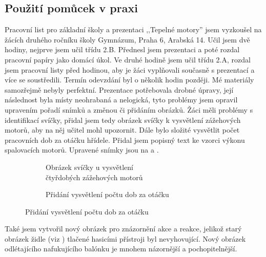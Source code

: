 \subsection{Použití pomůcek v praxi}\label{sc:pouzitiVPraxi}
{Pracovní list pro základní školy a prezentaci ,,Tepelné motory'' jsem vyzkoušel na žácích druhého ročníku školy Gymnázum, Praha 6, Arabská 14. Učil jsem dvě hodiny, nejprve jsem učil třídu 2.B. Přednesl jsem prezentaci a poté rozdal pracovní papíry jako domácí úkol. Ve druhé hodině jsem učil třídu 2.A, rozdal jsem pracovní listy před hodinou, aby je žáci vyplňovali současně s prezentací a více se soustředili. Termín odevzdání byl o několik hodin později.}\odst
{Mé materiály samozřejmě nebyly perfektní. Prezentace potřebovala drobné úpravy, její následnost byla místy neohrabaná a nelogická, tyto problémy jsem opravil upravením pořadí snímků a změnou či přidáním obrázků.}\odst
{Žáci měli problémy s identifikací svíčky, přidal jsem tedy obrázek svíčky k vysvětlení zážehových motorů, aby na něj učitel mohl upozornit. Dále bylo složité vysvětlit počet pracovních dob za otáčku hřídele. Přidal jsem popisný text ke vzorci výkonu spalovacích motorů. Upravené snímky jsou na  a .}
\begin{figure}[H]
    \begingroup
    \makeatletter
    \renewcommand\thesubfigure{\thefigure~--~\@nameuse{subfiglabel@\alph{subfigure}}}
    \newcommand{\subfiglabel@a}{vlevo}
    \newcommand{\subfiglabel@b}{vpravo}
    \captionsetup[subfigure]{labelformat=simple, labelsep=colon}
    \renewcommand\p@subfigure{}
    \makeatother
    \begin{subfigure}{0.47\textwidth}
        \centering
        \setlength{\fboxsep}{0pt}
        \caption{Obrázek svíčky u vysvětlení\\čtyřdobých zážehových motorů \jaObr}
        \label{obr:svickaSlide}
    \end{subfigure}\hfill
    \begin{subfigure}{0.47\textwidth}
        \centering
        \setlength{\fboxsep}{0pt}
        \caption{Přidání vysvětlení počtu dob za otáčku \jaObr}
        \label{obr:vzorceSlide}
    \end{subfigure}
    \endgroup
\end{figure}
{Také jsem vytvořil nový obrázek pro znázornění akce a reakce, jelikož starý obrázek židle (viz ) tlačené hasicími přístroji byl nevyhovující. Nový obrázek  odlétajícího nafukujícího balónku je mnohem názornější a pochopitelnější.}
